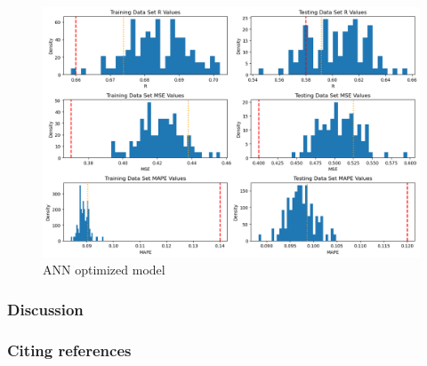 \documentclass{article}
\begin{document}
\begin{figure}
	\centering
	\includegraphics[width=\linewidth]{figures/ANN_optimized_model.png}
	\caption{ANN optimized model}
	\label{fig:ANN-optimized-model}
\end{figure}




\subsubsection{Discussion}




\subsubsection{Citing references}




\end{document}
